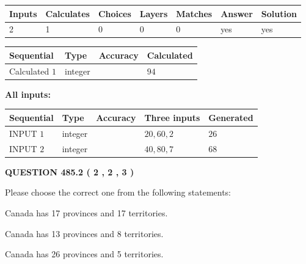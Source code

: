 \documentclass[12pt]{article}
\begin{document}
   
\noindent\begin{tabular}{|l|l|l|l|l|l|l|}
 \hline
Inputs & Calculates & Choices & Layers & Matches & Answer & Solution \\ \hline
 2  & 
 1  & 
 0
  & 
 0  & 
 0  & 
  yes & 
  yes 
  \\ \hline
 \end{tabular}
   
   
   
   
\noindent{}
   
   
  
  
\noindent\begin{tabular}{|l|l|l|l|}
\hline
 Sequential & Type & Accuracy & Calculated \\ 
\hline
 
 
  Calculated $  1 $ & integer &  & 
  $ 94 $ 
 \\  \hline  
 \end{tabular}
   
   
   
   
\noindent\vspace{0.1in}\hspace{-0.08in} {\textbf{\Large{All inputs: }}}
   
   
  
  
\noindent\begin{tabular}{|l|l|l|l|l|}
\hline
 Sequential & Type & Accuracy & Three inputs & Generated \\ 
\hline
 
 
  INPUT $  1 $ & integer &  & $
 20
 , 
 60
 , 
 2
 $ & $ 26 $ 
 \\  \hline  
 
 
  INPUT $  2 $ & integer &  & $
 40
 , 
 80
 , 
 7
 $ & $ 68 $ 
 \\  \hline  
 \end{tabular}
   
   
  
\vspace{0.2in}
  
{\textbf{\Large{QUESTION
485.2 
 ( 2 , 2 , 3 )
}}}
  
  
Please choose the correct one from the following statements:
 
 
Canada has  17 provinces and  17 territories.
 
 
Canada has  13 provinces and  8 territories.
 
 
Canada has  26 provinces and  5 territories.
 
\end{document}
